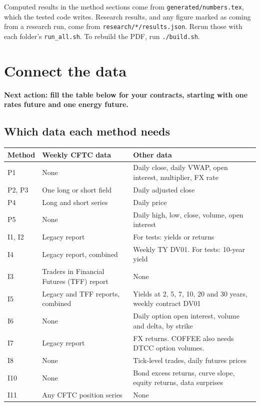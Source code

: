 \documentclass[11pt,a4paper]{article}
\newcommand{\code}[1]{\nolinkurl{#1}}
\begin{document}
Computed results in the method sections come from \code{generated/numbers.tex}, which the tested code writes. Research results, and any figure marked as coming from a research run, come from \code{research/*/results.json}. Rerun those with each folder's \code{run_all.sh}. To rebuild the PDF, run \code{./build.sh}.

\section{Connect the data}\label{sec:data}

\textbf{Next action: fill the table below for your contracts, starting with one rates future and one energy future.}

\subsection{Which data each method needs}
\small
\begin{tabularx}{\linewidth}{@{}lXX@{}}
\toprule
Method & Weekly CFTC data & Other data \\
\midrule
P1 & None & Daily close, daily VWAP, open interest, multiplier, FX rate \\
P2, P3 & One long or short field & Daily adjusted close \\
P4 & Long and short series & Daily price \\
P5 & None & Daily high, low, close, volume, open interest \\
I1, I2 & Legacy report & For tests: yields or returns \\
I4 & Legacy report, combined & Weekly TY DV01. For tests: 10-year yield \\
I3 & Traders in Financial Futures (TFF) report & None \\
I5 & Legacy and TFF reports, combined & Yields at 2, 5, 7, 10, 20 and 30 years, weekly contract DV01 \\
I6 & None & Daily option open interest, volume and delta, by strike \\
I7 & Legacy report & FX returns. COFFEE also needs DTCC option volumes. \\
I8 & None & Tick-level trades, daily futures prices \\
I10 & None & Bond excess returns, curve slope, equity returns, data surprises \\
I11 & Any CFTC position series & None \\
\bottomrule
\end{tabularx}
\normalsize
\end{document}
